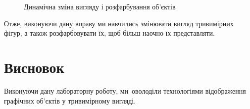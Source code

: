 \documentclass[
	a4paper,
	oneside,
	BCOR = 10mm,
	DIV = 12,
	12pt,
	headings = normal,
]{scrartcl}
\newlength{\gridunitwidth}
\begin{document}
\begin{figure}[!htbp]
\begin{subfigure}[b]{6 \gridunitwidth - (1em / 2)}
					\caption{}
					\label{subfig:05-viewport-single-02}
				\end{subfigure}
				\caption{Динамічна зміна вигляду і розфарбування об'єктів}
				\label{fig:05-dynamic-rotation}
			\end{figure}

		Отже, виконуючи дану вправу ми навчились змінювати вигляд тривимірних фігур, а також розфарбовувати їх, щоб більш наочно їх представляти.

	\section{Висновок}
		Виконуючи дану лабораторну роботу, ми~оволоділи технологіями відображення графічних об'єктів у тривимірному вигляді.
\end{document}
